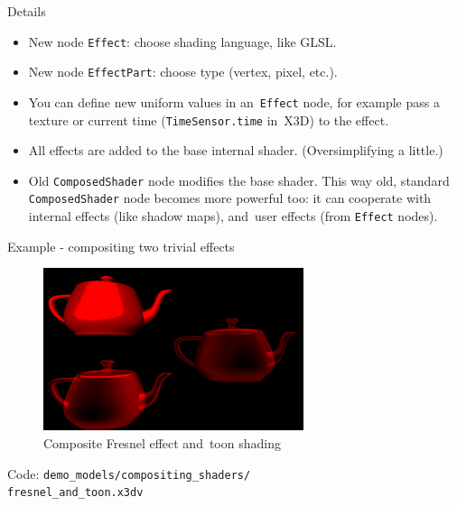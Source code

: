 \documentclass{beamer}
\begin{document}
\begin{frame}{Details}
\begin{itemize}
  \item New node \texttt{Effect}: choose shading language, like GLSL.
  \item New node \texttt{EffectPart}: choose type (vertex, pixel, etc.).
  \item You can define new uniform values in an~\texttt{Effect} node,
    for example pass a texture or current time (\texttt{TimeSensor.time} in~X3D)
    to the effect.
  \item All effects are added to the base internal shader. (Oversimplifying a little.)
  \item Old \texttt{ComposedShader} node modifies the base shader.
    This way old, standard \texttt{ComposedShader} node becomes more powerful too:
    it can cooperate with internal effects (like shadow maps),
    and~user effects (from \texttt{Effect} nodes).
\end{itemize}
\end{frame}

\begin{frame}{Example - compositing two trivial effects}
\begin{figure}
  \centering
  \includegraphics[width=3.0in]{../fresnel_and_toon}
  \caption{Composite Fresnel effect and~toon shading}
\end{figure}

Code: \texttt{demo\_models/compositing\_shaders/\\fresnel\_and\_toon.x3dv}

\end{frame}
\end{document}
